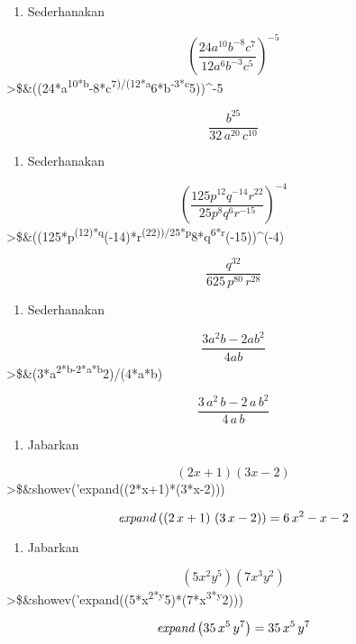 \documentclass[
]{book}
\providecommand{\tightlist}{%
  \setlength{\itemsep}{0pt}\setlength{\parskip}{0pt}}
\begin{document}
\begin{enumerate}
\def\labelenumi{\arabic{enumi}.}
\tightlist
\item
  Sederhanakan
\end{enumerate}

\[\left(\frac{24a^{10}b^{-8}c^7}{12a^{6}b^{-3}c^5}\right)^{-5}\]\textgreater\$\&((24*a\textsuperscript{10*b}-8*c\textsuperscript{7)/(12*a}6*b\textsuperscript{-3*c}5))\^{}-5

\[\frac{b^{25}}{32\,a^{20}\,c^{10}}\]

\begin{enumerate}
\def\labelenumi{\arabic{enumi}.}
\setcounter{enumi}{1}
\tightlist
\item
  Sederhanakan
\end{enumerate}

\[\left(\frac{125p^{12}q^{-14}r^{22}}{25p^8q^6r^{-15}}\right)^{-4}\]\textgreater\$\&((125*p\textsuperscript{(12)*q}(-14)*r\textsuperscript{(22))/25*p}8*q\textsuperscript{6*r}(-15))\^{}(-4)

\[\frac{q^{32}}{625\,p^{80}\,r^{28}}\]

\begin{enumerate}
\def\labelenumi{\arabic{enumi}.}
\setcounter{enumi}{2}
\tightlist
\item
  Sederhanakan
\end{enumerate}

\[\frac{3a^2b-2ab^2}{4ab}\]\textgreater\$\&(3*a\textsuperscript{2*b-2*a*b}2)/(4*a*b)

\[\frac{3\,a^2\,b-2\,a\,b^2}{4\,a\,b}\]

\begin{enumerate}
\def\labelenumi{\arabic{enumi}.}
\setcounter{enumi}{3}
\tightlist
\item
  Jabarkan
\end{enumerate}

\[(2x+1)(3x-2)\]\textgreater\$\&showev('expand((2*x+1)*(3*x-2)))

\[{\it expand}\left(\left(2\,x+1\right)\,\left(3\,x-2\right)\right)=6
 \,x^2-x-2\]

\begin{enumerate}
\def\labelenumi{\arabic{enumi}.}
\setcounter{enumi}{4}
\tightlist
\item
  Jabarkan
\end{enumerate}

\[(5x^2y^5)(7x^3y^2)\]\textgreater\$\&showev('expand((5*x\textsuperscript{2*y}5)*(7*x\textsuperscript{3*y}2)))

\[{\it expand}\left(35\,x^5\,y^7\right)=35\,x^5\,y^7\] 
\end{document}

